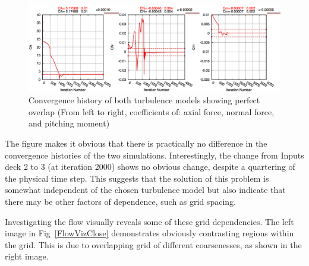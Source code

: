 \documentclass[]{aiaa-tc}%
\begin{document}
\begin{figure}[htb!]
\begin{center}
\includegraphics[width=\textwidth]{Images/ConvergHist.png}
\caption{Convergence history of both turbulence models showing perfect overlap (From left to right, coefficients of: axial force, normal force, and pitching moment)}
\label{ConvergHist}
\end{center}
\end{figure}
\vspace{-2em}

The figure makes it obvious that there is practically no difference in the convergence histories of the two simulations.  Interestingly, the change from Inputs deck 2 to 3 (at iteration 2000) shows no obvious change, despite a quartering of the physical time step.  This suggests that the solution of this problem is somewhat independent of the chosen turbulence model but also indicate that there may be other factors of dependence, such as grid spacing.

Investigating the flow visually reveals some of these grid dependencies.  The left image in Fig~\ref{FlowVizClose} demonstrates obviously contrasting regions within the grid.  This is due to overlapping grid of different coarsenesses, as shown in the right image.
\end{document}
